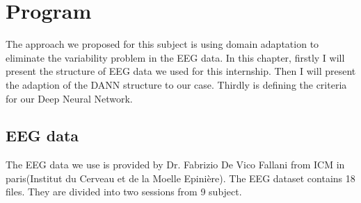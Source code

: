 
\chapter{Program} %

\label{Chapter4} %

The approach we proposed for this subject is using domain adaptation to eliminate the variability problem in the EEG data. In this chapter, firstly I will present the structure of EEG data we used for this internship. Then I will present the adaption of the DANN structure to our case. Thirdly is defining the criteria for our Deep Neural Network.
\section{EEG data}
The EEG data we use is provided by Dr. Fabrizio De Vico Fallani from ICM in paris(Institut du Cerveau et de la Moelle Epinière). The EEG dataset contains 18 files. They are divided into two sessions from 9 subject. 

